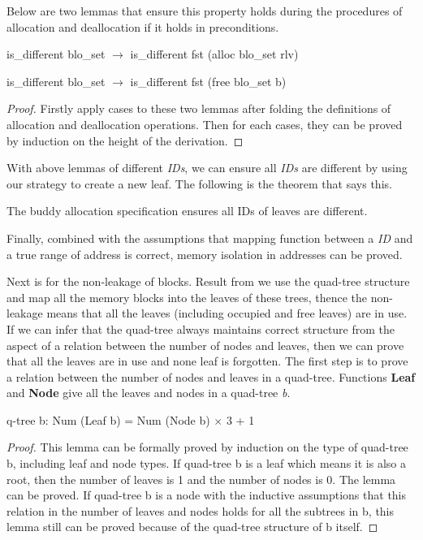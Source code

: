 \documentclass[runningheads]{llncs}
\begin{document}
Below are two lemmas that ensure this property holds during the procedures of allocation and deallocation if it holds in preconditions.

\begin{lemma}
is\_different blo\_set $\longrightarrow$ is\_different fst (alloc blo\_set rlv)
\end{lemma}

\begin{lemma}
is\_different blo\_set $\longrightarrow$ is\_different fst (free blo\_set b)
\end{lemma}

\begin{proof}
Firstly apply cases to these two lemmas after folding the definitions of allocation and deallocation operations. Then for each cases, they can be proved by induction on the height of the derivation.
\end{proof}

With above lemmas of different \emph{IDs}, we can ensure all \emph{IDs} are different by using our strategy to create a new leaf. The following is the theorem that says this.

\begin{theorem}
The buddy allocation specification ensures all IDs of leaves are different.
\end{theorem}

Finally, combined with the assumptions that mapping function between a \emph{ID} and a true range of address is correct, memory isolation in addresses can be proved.

Next is for the non-leakage of blocks. Result from we use the quad-tree structure and map all the memory blocks into the leaves of these trees, thence the non-leakage means that all the leaves (including occupied and free leaves) are in use. If we can infer that the quad-tree always maintains correct structure from the aspect of a relation between the number of nodes and leaves, then we can prove that all the leaves are in use and none leaf is forgotten. The first step is to prove a relation between the number of nodes and leaves in a quad-tree. Functions \textbf{Leaf} and \textbf{Node} give all the leaves and nodes in a quad-tree \emph{b}.

\begin{lemma}
q-tree b: Num (Leaf b) = Num (Node b) $\times$ 3 + 1
\end{lemma}

\begin{proof}
This lemma can be formally proved by induction on the type of quad-tree b, including leaf and node types. If quad-tree b is a leaf which means it is also a root, then the number of leaves is 1 and the number of nodes is 0. The lemma can be proved. If quad-tree b is a node with the inductive assumptions that this relation in the number of leaves and nodes holds for all the subtrees in b, this lemma still can be proved because of the quad-tree structure of b itself.
\end{proof}
\end{document}
